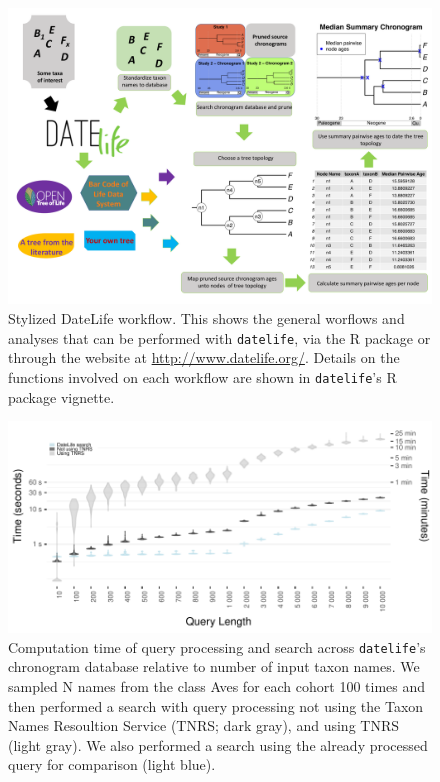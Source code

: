 \documentclass[
  english,
  man]{apa6}
\begin{document}
\newpage
\begin{figure}[!h]
\includegraphics{../figures/figure1/figure1-vertical-final.pdf}
\caption{Stylized DateLife workflow. This shows the general worflows and analyses that can be performed with \texttt{datelife}, via the R package or through the website  at \url{http://www.datelife.org/}. Details on the functions involved on each workflow are shown in \texttt{datelife}'s R package vignette.
}
\label{fig:workflow}
\end{figure}
\newpage
\begin{figure}[!h]
\includegraphics[width=1\linewidth]{../figures/fig_runtime_main.pdf}
\caption{Computation time of query processing and search across \texttt{datelife}'s chronogram database relative to number of input taxon names. We sampled N names from the class Aves for each cohort 100 times and then performed a search with query processing not using the Taxon Names Resoultion Service (TNRS; dark gray), and using TNRS (light gray). We also performed a search using the already processed query for comparison (light blue).}
\label{fig:runtime1}
\end{figure}
\end{document}

